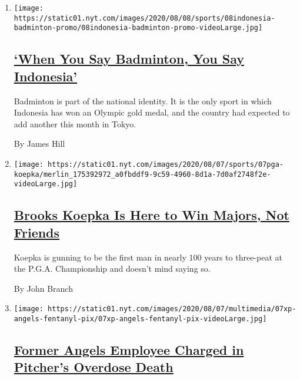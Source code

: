 \begin{enumerate}
\def\labelenumi{\arabic{enumi}.}
\item
  \texttt{[image: https://static01.nyt.com/images/2020/08/08/sports/08indonesia-badminton-promo/08indonesia-badminton-promo-videoLarge.jpg]}

  \hypertarget{when-you-say-badminton-you-say-indonesia}{%
  \subsection{\texorpdfstring{\href{/2020/08/07/sports/badminton-indonesia.html}{`When
  You Say Badminton, You Say
  Indonesia'}}{`When You Say Badminton, You Say Indonesia'}}\label{when-you-say-badminton-you-say-indonesia}}

  Badminton is part of the national identity. It is the only sport in
  which Indonesia has won an Olympic gold medal, and the country had
  expected to add another this month in Tokyo.

  By James Hill
\item
  \texttt{[image: https://static01.nyt.com/images/2020/08/07/sports/07pga-koepka/merlin\_175392972\_a0fbddf9-9c59-4960-8d1a-7d0af2748f2e-videoLarge.jpg]}

  \hypertarget{brooks-koepka-is-here-to-win-majors-not-friends}{%
  \subsection{\texorpdfstring{\href{/2020/08/07/sports/brooks-koepka-pga-championship.html}{Brooks
  Koepka Is Here to Win Majors, Not
  Friends}}{Brooks Koepka Is Here to Win Majors, Not Friends}}\label{brooks-koepka-is-here-to-win-majors-not-friends}}

  Koepka is gunning to be the first man in nearly 100 years to
  three-peat at the P.G.A. Championship and doesn't mind saying so.

  By John Branch
\item
  \texttt{[image: https://static01.nyt.com/images/2020/08/07/multimedia/07xp-angels-fentanyl-pix/07xp-angels-fentanyl-pix-videoLarge.jpg]}

  \hypertarget{former-angels-employee-charged-in-pitchers-overdose-death}{%
  \subsection{\texorpdfstring{\href{/2020/08/07/sports/baseball/la-angels-fentanyl-tyler-skaggs.html}{Former
  Angels Employee Charged in Pitcher's Overdose
  Death}}{Former Angels Employee Charged in Pitcher's Overdose Death}}\label{former-angels-employee-charged-in-pitchers-overdose-death}}


\end{enumerate}
